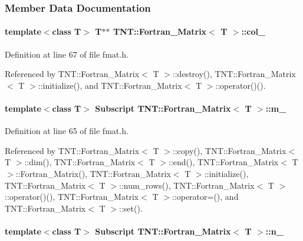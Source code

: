 \subsubsection{Member Data Documentation}
\paragraph[{col\_\-}]{\setlength{\rightskip}{0pt plus 5cm}template$<$class T$>$ T$\ast$$\ast$ {\bf TNT::Fortran\_\-Matrix}$<$ T $>$::{\bf col\_\-}}\hfill\label{class_t_n_t_1_1_fortran___matrix_a3c6be5332f47815486e31b62910e0ab1}


Definition at line 67 of file fmat.h.



Referenced by TNT::Fortran\_\-Matrix$<$ T $>$::destroy(), TNT::Fortran\_\-Matrix$<$ T $>$::initialize(), and TNT::Fortran\_\-Matrix$<$ T $>$::operator()().

\paragraph[{m\_\-}]{\setlength{\rightskip}{0pt plus 5cm}template$<$class T$>$ {\bf Subscript} {\bf TNT::Fortran\_\-Matrix}$<$ T $>$::{\bf m\_\-}}\hfill\label{class_t_n_t_1_1_fortran___matrix_a46cf332ea8ddc7772f810e07e562cce4}


Definition at line 65 of file fmat.h.



Referenced by TNT::Fortran\_\-Matrix$<$ T $>$::copy(), TNT::Fortran\_\-Matrix$<$ T $>$::dim(), TNT::Fortran\_\-Matrix$<$ T $>$::end(), TNT::Fortran\_\-Matrix$<$ T $>$::Fortran\_\-Matrix(), TNT::Fortran\_\-Matrix$<$ T $>$::initialize(), TNT::Fortran\_\-Matrix$<$ T $>$::num\_\-rows(), TNT::Fortran\_\-Matrix$<$ T $>$::operator()(), TNT::Fortran\_\-Matrix$<$ T $>$::operator=(), and TNT::Fortran\_\-Matrix$<$ T $>$::set().

\paragraph[{n\_\-}]{\setlength{\rightskip}{0pt plus 5cm}template$<$class T$>$ {\bf Subscript} {\bf TNT::Fortran\_\-Matrix}$<$ T $>$::{\bf n\_\-}}\hfill\label{class_t_n_t_1_1_fortran___matrix_ad5c8562413e6a438274c565a9b6fafc2}


